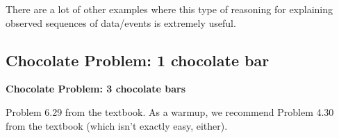 \documentclass[10pt]{article}
\begin{document}
There are a lot of other examples where this type of reasoning for explaining observed sequences of data/events is extremely useful.

\subsection*{Chocolate Problem: 1 chocolate bar}
  \textbf{Chocolate Problem: 3 chocolate bars}
  
  Problem 6.29 from the textbook.
  As a warmup, we recommend Problem 4.30 from the textbook (which isn't exactly easy, either).
\end{document}
